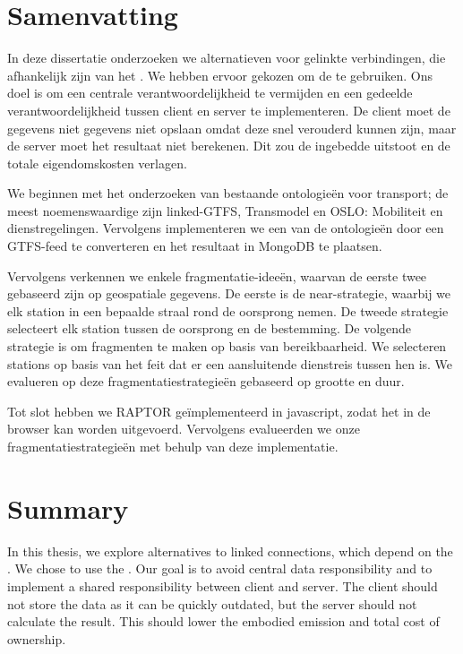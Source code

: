 \chapter*{Samenvatting}
In deze dissertatie onderzoeken we alternatieven voor gelinkte verbindingen, die afhankelijk zijn van het . We hebben ervoor gekozen om de  te gebruiken. Ons doel is om een centrale verantwoordelijkheid te vermijden en een gedeelde verantwoordelijkheid tussen client en server te implementeren. De client moet de gegevens niet gegevens niet opslaan omdat deze snel verouderd kunnen zijn, maar de server moet het resultaat niet berekenen. Dit zou de ingebedde uitstoot en de totale eigendomskosten verlagen.

We beginnen met het onderzoeken van bestaande ontologieën voor transport; de meest noemenswaardige zijn linked-GTFS, Transmodel en OSLO: Mobiliteit en dienstregelingen. Vervolgens implementeren we een van de ontologieën door een GTFS-feed te converteren en het resultaat in MongoDB te plaatsen.

Vervolgens verkennen we enkele fragmentatie-ideeën, waarvan de eerste twee gebaseerd zijn op geospatiale gegevens. De eerste is de near-strategie, waarbij we elk station in een bepaalde straal rond de oorsprong nemen. De tweede strategie selecteert elk station tussen de oorsprong en de bestemming. De volgende strategie is om fragmenten te maken op basis van bereikbaarheid. We
selecteren stations op basis van het feit dat er een aansluitende dienstreis tussen hen is. We evalueren op deze fragmentatiestrategieën gebaseerd op grootte en duur.

Tot slot hebben we RAPTOR geïmplementeerd in javascript, zodat het in de browser kan worden uitgevoerd. Vervolgens evalueerden we onze fragmentatiestrategieën met behulp van deze implementatie.

\newpage
\chapter*{Summary}
In this thesis, we explore alternatives to linked connections, which depend on the . We chose to use the . Our goal is to avoid central data responsibility and to implement a shared responsibility between client and server. The client should not store the data as it can be quickly outdated, but the server should not calculate the result. This should lower the embodied emission and total cost of ownership. 

